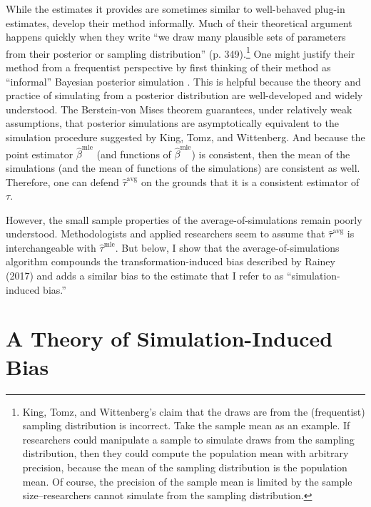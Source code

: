 \documentclass[12pt]{article}
\begin{document}
While the estimates it provides are sometimes similar to well-behaved plug-in estimates, \cite{KingTomzWittenberg2000} develop their method informally. 
Much of their theoretical argument happens quickly when they write ``we draw many plausible sets of parameters from their posterior or sampling distribution'' (p. 349).\footnote{King, Tomz, and Wittenberg's claim that the draws are from the (frequentist) sampling distribution is incorrect. Take the sample mean as an example. If researchers could manipulate a sample to simulate draws from the sampling distribution, then they could compute the population mean with arbitrary precision, because the mean of the sampling distribution is the population mean. Of course, the precision of the sample mean is limited by the sample size--researchers cannot simulate from the sampling distribution.}
One might justify their method from a frequentist perspective by first thinking of their method as ``informal'' Bayesian posterior simulation \citep{GelmanHill2006}.  
This is helpful because the theory and practice of simulating from a posterior distribution are well-developed and widely understood. 
The Berstein-von Mises theorem \citep[pp.\@ 140-146]{vanderVaart2000} guarantees, under relatively weak assumptions, that posterior simulations are asymptotically equivalent to the simulation procedure suggested by King, Tomz, and Wittenberg. And because the point estimator $\hat{\beta}^{\text{mle}}$ (and functions of $\hat{\beta}^{\text{mle}}$) is consistent, then the mean of the simulations (and the mean of functions of the simulations) are consistent as well. Therefore, one can defend $\hat{\tau}^{\text{avg}}$ on the grounds that it is a consistent estimator of $\tau$. 

However, the small sample properties of the average-of-simulations remain poorly understood. Methodologists and applied researchers seem to assume that $\hat{\tau}^{\text{avg}}$ is interchangeable with  $\hat{\tau}^{\text{mle}}$. 
But below, I show that the average-of-simulations algorithm compounds the transformation-induced bias described by Rainey (2017) and adds a similar bias to the estimate that I refer to as ``simulation-induced bias.'' 

\section*{A Theory of Simulation-Induced Bias}
\end{document}
